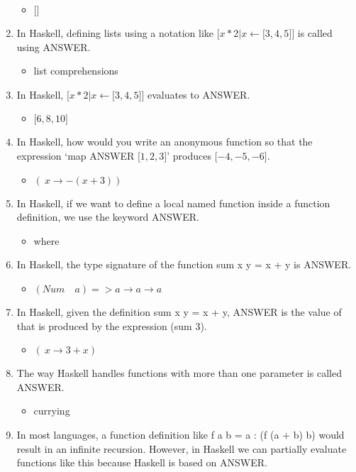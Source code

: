 \documentclass{exam}
\begin{document}
\begin{enumerate}
\begin{itemize}
\item $\lbrack\rbrack$
\end{itemize}
\item In Haskell, defining lists using a notation like $\lbrack x * 2 | x \leftarrow \lbrack 3, 4, 5\rbrack \rbrack$ is called using ANSWER.
\begin{itemize}
\item list comprehensions
\end{itemize}
\item In Haskell, $\lbrack x * 2 | x \leftarrow \lbrack 3, 4, 5\rbrack \rbrack$  evaluates to ANSWER.
\begin{itemize}
\item $\lbrack 6, 8, 10\rbrack$
\end{itemize}
\item In Haskell, how would you write an anonymous function so that the expression `map ANSWER $\lbrack 1, 2, 3\rbrack$' produces $\lbrack -4, -5, -6\rbrack$.
\begin{itemize}
\item $(\ x \rightarrow - (x + 3))$
\end{itemize}
\item In Haskell, if we want to define a local named function inside a function definition, we use the keyword ANSWER.
\begin{itemize}
\item where
\end{itemize}
\item In Haskell, the type signature of the function sum x y = x + y is ANSWER.
\begin{itemize}
\item $(Num \quad a) => a \rightarrow a \rightarrow a$
\end{itemize}
\item In Haskell, given the definition sum x y = x + y, ANSWER is the value of that is produced by the expression (sum 3).
\begin{itemize}
\item $(\ x \rightarrow 3 + x)$
\end{itemize}
\item The way Haskell handles functions with more than one parameter is called ANSWER.
\begin{itemize}
\item currying
\end{itemize}
\item In most languages, a function definition like f a b = a : (f (a + b) b) would result in an infinite recursion.  However, in Haskell we can partially evaluate functions like this because Haskell is based on ANSWER.

\end{enumerate}
\end{document}
